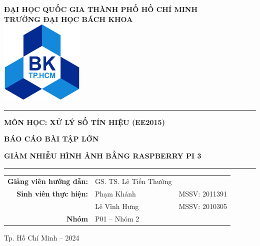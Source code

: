 \begin{titlepage}
    
    \begin{center}
    	\textbf{ĐẠI HỌC QUỐC GIA THÀNH PHỐ HỒ CHÍ MINH}\\[3pt]
    	\textbf{TRƯỜNG ĐẠI HỌC BÁCH KHOA}\\ 
    	
    	\vspace{1.5cm}
    	\includegraphics[width=4cm]{../images/logo_BK.png}
    	\vspace{0.5cm}
    \end{center}
    
    \begin{center}
        \setlength{\parskip}{.5em}
        \par\noindent\rule{0.8\textwidth}{0.4pt}

        \textbf{{MÔN HỌC: XỬ LÝ SỐ TÍN HIỆU (EE2015)}}
        
        \textbf{{\large BÁO CÁO BÀI TẬP LỚN}}
    	    
        \textbf{{GIẢM NHIỄU HÌNH ẢNH BẰNG RASPBERRY PI 3}}
        \par\noindent\rule{0.8\textwidth}{0.4pt}
    \end{center}
    
    \vspace{1em}
    \begin{center}
        \renewcommand{\arraystretch}{1.5}
        \begin{tabular}{R{0.35} L{0.3} L{0.25}}
            \textbf{Giảng viên hướng dẫn:} & GS. TS. Lê Tiến Thường\\
            \textbf{Sinh viên thực hiện:} & Phạm Khánh & MSSV: 2011391\\
            & Lê Vĩnh Hưng & MSSV: 2010305\\
            \textbf{Nhóm} & P01 -- Nhóm 2 & 
        \end{tabular}
    \end{center}
    
    \vfill
    \begin{center}
        Tp. Hồ Chí Minh -- 2024
    \end{center}
    \vspace{1em}
\end{titlepage}